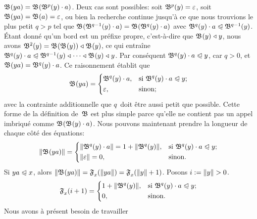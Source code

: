 \(\mathfrak{B}^{}(ya) = \mathfrak{B}^{}(\mathfrak{B}^{p}(y) \cdot a)\). Deux cas sont
possibles: soit \(\mathfrak{B}^{p}(y) = \varepsilon\), soit \(\mathfrak{B}^{}(ya)
= \mathfrak{B}^{}(a) = \varepsilon\), ou bien la recherche continue jusqu'à
ce que nous trouvions le plus petit \(q > p\) tel que
\(\mathfrak{B}^{}(\mathfrak{B}^{q-1}(y) \cdot a) = \mathfrak{B}^{}(\mathfrak{B}^{q}(y) \cdot
  a)\) avec \(\mathfrak{B}^{q}(y) \cdot a \mathrel{\trianglelefteqslant} \mathfrak{B}^{q-1}(y)\). Étant
donné qu'un bord est un préfixe propre, c'est-à-dire que
\(\mathfrak{B}^{}(y) \mathrel{\triangleleft} y\), nous avons \(\mathfrak{B}^{2}(y) =
\mathfrak{B}^{}(\mathfrak{B}^{}(y)) \mathrel{\triangleleft} \mathfrak{B}^{}(y)\), ce qui entraîne
\(\Border{q}{y} \cdot a \prefeq \Border{q-1}{y} \pref \dots \pref
\Border{}{y} \pref y\). Par conséquent \(\mathfrak{B}^{q}(y) \cdot a \mathrel{\trianglelefteqslant}
y\), car \({q > 0}\), et \(\mathfrak{B}^{}(ya) = \mathfrak{B}^{q}(y) \cdot a\). Ce
raisonnement établit que
\begin{equation*}
\mathfrak{B}^{}(ya) =
\left\{
  \begin{aligned}
   & \mathfrak{B}^{q}(y) \cdot a,
   && \text{si \(\mathfrak{B}^{q}(y) \cdot a \mathrel{\trianglelefteqslant}y\)};\\
   & \varepsilon,
   && \text{sinon;}
  \end{aligned}
\right.
\end{equation*}
avec la contrainte additionnelle que \(q\)~doit être aussi petit que
possible. Cette forme de la définition de~\(\mathfrak{B}\) est plus
simple parce qu'elle ne contient pas un appel imbriqué comme
\(\mathfrak{B}^{}(\mathfrak{B}^{}(y) \cdot a)\). Nous pouvons maintenant prendre
la longueur de chaque côté des équations:
\begin{equation*}
\lVert{\mathfrak{B}^{}(ya)}\rVert{} =
\left\{
  \begin{aligned}
   & \lVert{\mathfrak{B}^{q}(y) \cdot a}\rVert{} = 1 + \lVert{\mathfrak{B}^{q}(y)}\rVert{},
   && \text{si \(\mathfrak{B}^{q}(y) \cdot a \mathrel{\trianglelefteqslant}y\)};\\
   & \lVert{\varepsilon}\rVert{} = 0,
   && \text{sinon.}
  \end{aligned}
\right.
\end{equation*}
Si \({ya \mathrel{\trianglelefteqslant} x}\), alors \(\lVert{\mathfrak{B}^{}(ya)}\rVert{} =
\mathfrak{F}_{x}^{}(\lVert{ya}\rVert{}) = \mathfrak{F}_{x}^{}(\lVert{y}\rVert{}+1)\). Posons \(i
:= \lVert{y}\rVert{} > 0\).
\begin{equation*}
\mathfrak{F}_{x}^{}(i+1) =
\left\{
  \begin{aligned}
   & 1 + \lVert{\mathfrak{B}^{q}(y)}\rVert{},
   && \text{si \(\mathfrak{B}^{q}(y) \cdot a \mathrel{\trianglelefteqslant}y\)};\\
   & 0,
   && \text{sinon.}
  \end{aligned}
\right.
\end{equation*}
Nous avons à présent besoin de travailler
